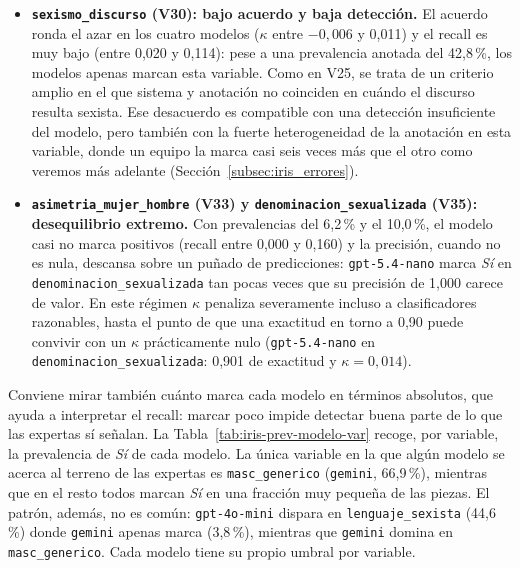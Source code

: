 \begin{itemize}
    \item \textbf{\texttt{sexismo\_discurso} (V30): bajo acuerdo y baja detección.} El
    acuerdo ronda el azar en los cuatro modelos ($\kappa$ entre $-0,006$ y 0,011) y el
    recall es muy bajo (entre 0,020 y 0,114): pese a una prevalencia anotada del
    42,8\,\%, los modelos apenas marcan esta variable. Como en V25, se trata de un
    criterio amplio en el que sistema y anotación no coinciden en cuándo el discurso
    resulta sexista. Ese desacuerdo es compatible con una detección insuficiente del
    modelo, pero también con la fuerte heterogeneidad de la anotación en esta variable,
    donde un equipo la marca casi seis veces más que el otro como veremos más adelante
    (Sección~\ref{subsec:iris_errores}).

    \item \textbf{\texttt{asimetria\_mujer\_hombre} (V33) y
    \texttt{denominacion\_sexualizada} (V35): desequilibrio extremo.} Con prevalencias
    del 6,2\,\% y el 10,0\,\%, el modelo casi no marca positivos (recall entre 0,000 y
    0,160) y la precisión, cuando no es nula, descansa sobre un puñado de
    predicciones: \texttt{gpt-5.4-nano} marca \textit{Sí} en \texttt{denominacion\_sexualizada}
    tan pocas veces que su precisión de 1,000 carece de valor. En este régimen
    $\kappa$ penaliza severamente incluso a clasificadores razonables, hasta el punto
    de que una exactitud en torno a 0,90 puede convivir con un $\kappa$ prácticamente
    nulo (\texttt{gpt-5.4-nano} en \texttt{denominacion\_sexualizada}: 0,901 de
    exactitud y $\kappa = 0,014$).
\end{itemize}

\newpage

Conviene mirar también cuánto marca cada modelo en términos absolutos, que ayuda a
interpretar el recall: marcar poco impide detectar buena parte de lo que las
expertas sí señalan. La Tabla~\ref{tab:iris-prev-modelo-var} recoge, por variable, la
prevalencia de \textit{Sí} de cada modelo. La única variable en la que algún modelo
se acerca al terreno de las expertas es \texttt{masc\_generico} (\texttt{gemini},
66,9\,\%), mientras que en el resto todos marcan \textit{Sí} en una fracción muy
pequeña de las piezas. El patrón, además, no es común: \texttt{gpt-4o-mini} dispara
en \texttt{lenguaje\_sexista} (44,6\,\%) donde \texttt{gemini} apenas marca (3,8\,\%),
mientras que \texttt{gemini} domina en \texttt{masc\_generico}. Cada modelo tiene su
propio umbral por variable.

